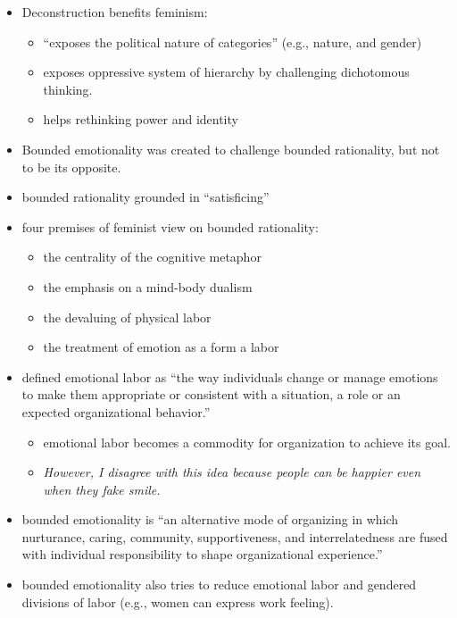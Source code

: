 \documentclass[
]{book}
\begin{document}
\begin{itemize}
\item
  Deconstruction benefits feminism:

  \begin{itemize}
  \item
    ``exposes the political nature of categories'' (e.g., nature, and
    gender)
  \item
    exposes oppressive system of hierarchy by challenging
    dichotomous thinking.
  \item
    helps rethinking power and identity
  \end{itemize}
\item
  Bounded emotionality was created to challenge bounded rationality,
  but not to be its opposite.
\item
  bounded rationality grounded in ``satisficing''
\item
  four premises of feminist view on bounded rationality:

  \begin{itemize}
  \item
    the centrality of the cognitive metaphor
  \item
    the emphasis on a mind-body dualism
  \item
    the devaluing of physical labor
  \item
    the treatment of emotion as a form a labor
  \end{itemize}
\item
  \citep{hochschild2012} defined emotional labor as ``the way individuals
  change or manage emotions to make them appropriate or consistent
  with a situation, a role or an expected organizational behavior.''

  \begin{itemize}
  \item
    emotional labor becomes a commodity for organization to achieve
    its goal.
  \item
    \emph{However, I disagree with this idea because people can be
    happier even when they fake smile.}
  \end{itemize}
\item
  bounded emotionality is ``an alternative mode of organizing in which
  nurturance, caring, community, supportiveness, and interrelatedness
  are fused with individual responsibility to shape organizational
  experience.''
\item
  bounded emotionality also tries to reduce emotional labor and
  gendered divisions of labor (e.g., women can express work feeling).
\end{itemize}
\end{document}
